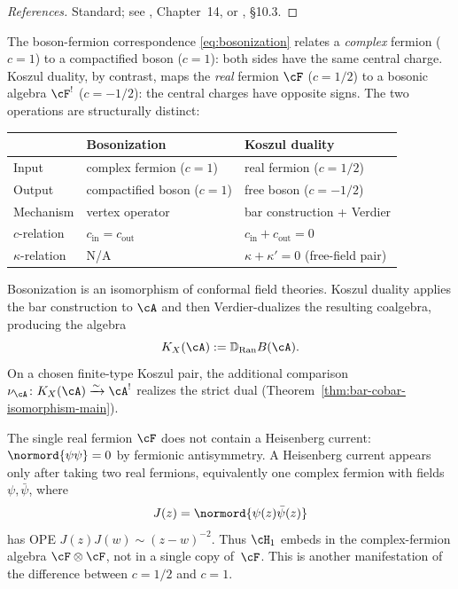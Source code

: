 \begin{proof}[References]
Standard; see \cite{FMS86}, Chapter~14, or
\cite{Pol98}, \S10.3.
\end{proof}

\begin{remark}
\label{rem:bosonization-not-koszul}
The boson-fermion correspondence
\eqref{eq:bosonization} relates a \emph{complex}
fermion ($c = 1$) to a compactified boson ($c = 1$):
both sides have the same central charge. Koszul
duality, by contrast, maps the \emph{real} fermion
$\cF$ ($c = 1/2$) to a bosonic algebra $\cF^!$
($c = -1/2$): the central charges have opposite signs.
The two operations are structurally distinct:
\begin{center}
\renewcommand{\arraystretch}{1.3}
\begin{tabular}{lll}
\toprule
& \textbf{Bosonization} & \textbf{Koszul duality} \\
\midrule
Input & complex fermion ($c = 1$) & real fermion ($c = 1/2$) \\
Output & compactified boson ($c = 1$) & free boson ($c = -1/2$) \\
Mechanism & vertex operator & bar construction + Verdier \\
$c$-relation & $c_{\mathrm{in}} = c_{\mathrm{out}}$
& $c_{\mathrm{in}} + c_{\mathrm{out}} = 0$ \\
$\kappa$-relation & N/A & $\kappa + \kappa' = 0$ \textup{(}free-field pair\textup{)} \\
\bottomrule
\end{tabular}
\end{center}
Bosonization is an isomorphism of conformal field theories.
Koszul duality applies the bar construction to $\cA$ and then
Verdier-dualizes the resulting coalgebra, producing the algebra
\[
K_X(\cA):=\mathbb{D}_{\mathrm{Ran}}B(\cA).
\]
On a chosen finite-type Koszul pair, the additional comparison
$\nu_{\cA}\colon K_X(\cA)\xrightarrow{\sim}\cA^!$ realizes the strict
dual \textup{(}Theorem~\textup{\ref{thm:bar-cobar-isomorphism-main})}.
\end{remark}

\begin{remark}
\label{rem:real-fermion-heisenberg}
The single real fermion $\cF$ does not contain a Heisenberg current:
$\normord{\psi\psi}=0$ by fermionic antisymmetry. A Heisenberg
current appears only after taking two real fermions, equivalently one
complex fermion with fields $\psi,\bar\psi$, where
\[
J(z)=\normord{\psi(z)\bar\psi(z)}
\]
has OPE $J(z)J(w)\sim (z-w)^{-2}$. Thus
$\cH_1$ embeds in the complex-fermion algebra
$\cF\otimes\cF$, not in a single copy of~$\cF$. This is another
manifestation of the difference between $c=1/2$ and $c=1$.
\end{remark}

